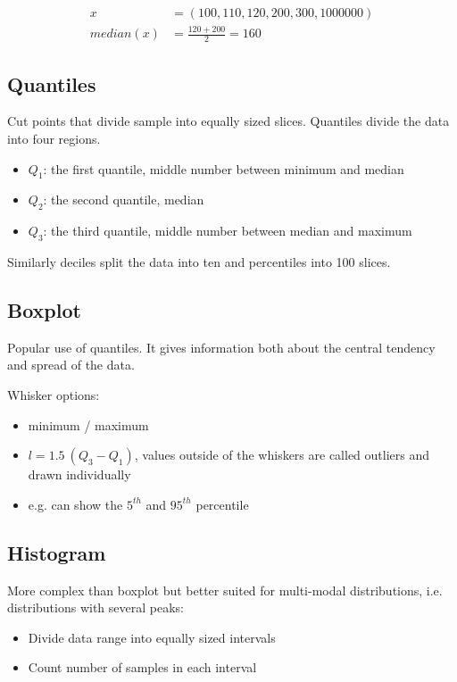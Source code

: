 \begin{align}
    x &= (100,110,120,200,300,1000000)\\
    median(x) &= \frac{120+200}{2} = 160
\end{align}
    
\subsection {Quantiles}
Cut points that divide sample into equally sized slices. 
Quantiles divide the data into four regions.
\begin{itemize}
  \item $Q_{1}$: the first quantile, middle number between minimum and median
  \item $Q_{2}$: the second quantile, median  
  \item $Q_{3}$: the third quantile, middle number between median and maximum
\end{itemize}


Similarly deciles split the data into ten and percentiles into 100 slices.
    
\subsection {Boxplot}
Popular use of quantiles. It gives information both about the central tendency and spread of the data.

    
Whisker options:
\begin{itemize}
\item minimum / maximum
\item $l=1.5 \ (Q_{3}-Q_{1})$, values outside of the whiskers are called outliers and drawn individually
\item e.g. can show the $5^{th}$ and $95^{th}$ percentile
\end{itemize}
    
    
\subsection {Histogram}
More complex than boxplot but better suited for multi-modal distributions, i.e. distributions with several peaks:
\begin{itemize}
  \item Divide data range into equally sized intervals
  \item Count number of samples in each interval
\end{itemize}
    
